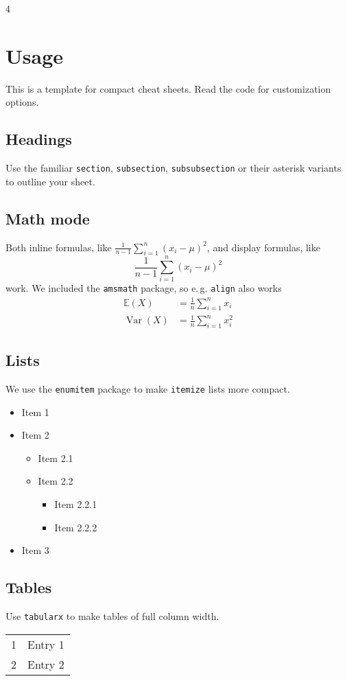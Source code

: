 \documentclass[%
  a4paper,     %
  landscape,   %
  english,     %
  7pt,         %
  fleqn        %
]{scrartcl}
\begin{document}
\begin{multicols*}{%
  4 %
}

\section*{Usage}

This is a template for compact cheat sheets. Read the code for customization options.

\subsection*{Headings}

Use the familiar \texttt{section}, \texttt{subsection}, \texttt{subsubsection} or their asterisk variants to outline your sheet.

\subsection*{Math mode}

Both inline formulas, like $\frac{1}{n-1} \sum_{i=1}^n (x_i - \mu)^2$, and display formulas, like
\[
  \frac{1}{n-1}\sum_{i=1}^n (x_i - \mu)^2
\]
work. We included the \texttt{amsmath} package, so e.\,g. \texttt{align} also works
\begin{align*}
  \mathbb E(X) &= \frac{1}{n} \sum_{i=1}^n x_i\\
  \operatorname{Var}(X) &= \frac{1}{n} \sum_{i=1}^n x_i^2
\end{align*}

\subsection*{Lists}

We use the \texttt{enumitem} package to make \texttt{itemize} lists more compact.

\begin{itemize}
  \item Item 1
  \item Item 2
  \begin{itemize}
    \item Item 2.1
    \item Item 2.2
    \begin{itemize}
      \item Item 2.2.1
      \item Item 2.2.2
    \end{itemize}
  \end{itemize}
  \item Item 3
\end{itemize}

\subsection*{Tables}

Use \texttt{tabularx} to make tables of full column width.

\begin{tabularx}{\columnwidth}{|c|X|}
  \hline
  1 & Entry 1\\
  2 & Entry 2\\
  \hline
\end{tabularx}


\end{multicols*}
\end{document}
